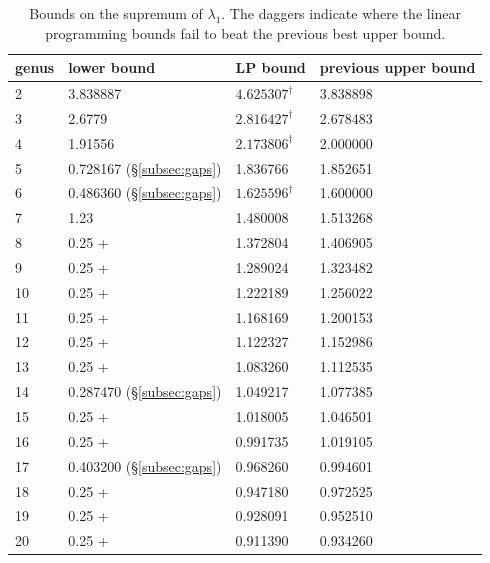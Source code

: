\documentclass[12pt]{amsart}
\numberwithin{equation}{section}
\begin{document}
{\footnotesize
\begin{table}[htp] 
\centering
\caption{Bounds on the supremum of $\lambda_1$. The daggers indicate where the linear programming bounds fail to beat the previous best upper bound.
} \label{table:lambda}
\begin{tabular}{|l|l|l|l|}
\hline
genus & lower bound & LP bound  & previous upper bound  \\
\hline
2 &  3.838887 \cite{StrohmaierUski} & $4.625307^\dagger$ & 3.838898 \cite{bootstrap,bootstrap2}\\
3 & 2.6779 \cite{Cook} & $2.816427^\dagger$ & 2.678483 \cite{bootstrap,bootstrap2}\\
4 & 1.91556 \cite{Cook} & $2.173806^\dagger$ & 2.000000  \cite{YangYau}\\
5 &   0.728167 (\S\ref{subsec:gaps})   & 1.836766 & 1.852651 \cite{bootstrap}\\
6 &   0.486360 (\S\ref{subsec:gaps})      & $1.625596^\dagger$ & 1.600000 \cite{YangYau}\\
7 &   1.23 \cite{Lee}     & 1.480008 & 1.513268 \cite{bootstrap}\\
8 &  0.25 \cite{BookerStrombergsson}+\cite{BBD} & 1.372804 & 1.406905 \cite{bootstrap}\\
9 &   0.25 \cite{BookerStrombergsson}+\cite{BBD}       & 1.289024 & 1.323482 \cite{bootstrap}\\
10 &   0.25 \cite{BookerStrombergsson}+\cite{BBD}      & 1.222189 & 1.256022 \cite{bootstrap}\\
11 &   0.25 \cite{BookerStrombergsson}+\cite{BBD}      & 1.168169  & 1.200153 \cite{bootstrap}\\
12 &   0.25 \cite{BookerStrombergsson}+\cite{BBD}      & 1.122327 & 1.152986 \cite{bootstrap}\\
13 &   0.25 \cite{BookerStrombergsson}+\cite{BBD}      & 1.083260 & 1.112535  \cite{bootstrap}\\
14 &   0.287470 (\S\ref{subsec:gaps})    & 1.049217 & 1.077385 \cite{bootstrap}\\
15 &   0.25 \cite{BookerStrombergsson}+\cite{BBD}   & 1.018005 & 1.046501 \cite{bootstrap}\\
16 &    0.25 \cite{BookerStrombergsson}+\cite{BBD}     & 0.991735 & 1.019105 \cite{bootstrap}\\
17 &   0.403200 (\S\ref{subsec:gaps})    & 0.968260 & 0.994601 \cite{bootstrap}\\
18 &     0.25 \cite{BookerStrombergsson}+\cite{BBD}    & 0.947180 & 0.972525 \cite{bootstrap}\\
19 &      0.25 \cite{BookerStrombergsson}+\cite{BBD}   & 0.928091 & 0.952510 \cite{bootstrap}\\
20 &     0.25 \cite{BookerStrombergsson}+\cite{BBD}    & 0.911390 & 0.934260 \cite{bootstrap}\\
\hline
\end{tabular}
\end{table}
}
\end{document}
